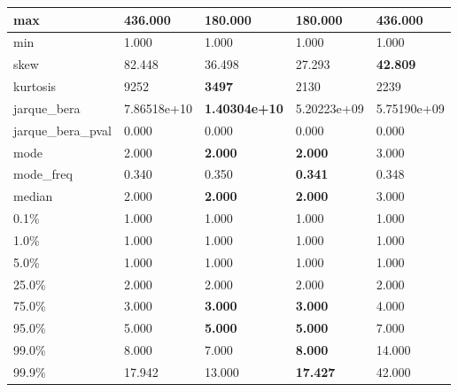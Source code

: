 \begin{table}[H]
\begin{tabular}{|l|m{10em}|m{10em}|m{10em}|m{10em}|}
\hline max & 436.000 & \cellcolor[rgb]{0.9, 0.54, 0.52} 180.000 & \cellcolor[rgb]{0.9, 0.54, 0.52} 180.000 & \bfseries 436.000 \\
\hline min & 1.000 & 1.000 & 1.000 & 1.000 \\
\hline skew & 82.448 & 36.498 & \cellcolor[rgb]{0.9, 0.54, 0.52} 27.293 & \bfseries 42.809 \\
\hline kurtosis & 9252 & \bfseries 3497 & \cellcolor[rgb]{0.9, 0.54, 0.52} 2130 & 2239 \\
\hline jarque\_bera & 7.86518e+10 & \bfseries 1.40304e+10 & \cellcolor[rgb]{0.9, 0.54, 0.52} 5.20223e+09 & 5.75190e+09 \\
\hline jarque\_bera\_pval & 0.000 & 0.000 & 0.000 & 0.000 \\
\hline mode & 2.000 & \bfseries 2.000 & \bfseries 2.000 & \cellcolor[rgb]{0.9, 0.54, 0.52} 3.000 \\
\hline mode\_freq & 0.340 & \cellcolor[rgb]{0.9, 0.54, 0.52} 0.350 & \bfseries 0.341 & 0.348 \\
\hline median & 2.000 & \bfseries 2.000 & \bfseries 2.000 & \cellcolor[rgb]{0.9, 0.54, 0.52} 3.000 \\
\hline 0.1\% & 1.000 & 1.000 & 1.000 & 1.000 \\
\hline 1.0\% & 1.000 & 1.000 & 1.000 & 1.000 \\
\hline 5.0\% & 1.000 & 1.000 & 1.000 & 1.000 \\
\hline 25.0\% & 2.000 & 2.000 & 2.000 & 2.000 \\
\hline 75.0\% & 3.000 & \bfseries 3.000 & \bfseries 3.000 & \cellcolor[rgb]{0.9, 0.54, 0.52} 4.000 \\
\hline 95.0\% & 5.000 & \bfseries 5.000 & \bfseries 5.000 & \cellcolor[rgb]{0.9, 0.54, 0.52} 7.000 \\
\hline 99.0\% & 8.000 & 7.000 & \bfseries 8.000 & \cellcolor[rgb]{0.9, 0.54, 0.52} 14.000 \\
\hline 99.9\% & 17.942 & 13.000 & \bfseries 17.427 & \cellcolor[rgb]{0.9, 0.54, 0.52} 42.000 \\
\hline
\end{tabular}
\end{table}
